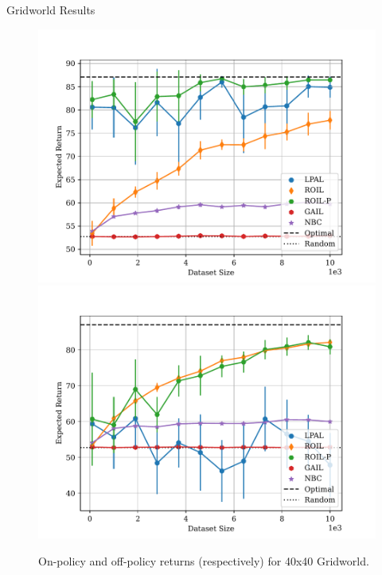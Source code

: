 \begin{block}{Gridworld Results}
    \begin{center}
        \begin{figure}
            \includegraphics[]{../../pres_roil/plots/returns/40x40_gridworld_on_policy_returns.pdf}
            \includegraphics[]{../../pres_roil/plots/returns/40x40_gridworld_off_policy_returns.pdf}
            \caption{On-policy and off-policy returns (respectively) for 40x40 Gridworld.}
        \end{figure}
    \end{center}
\end{block}



